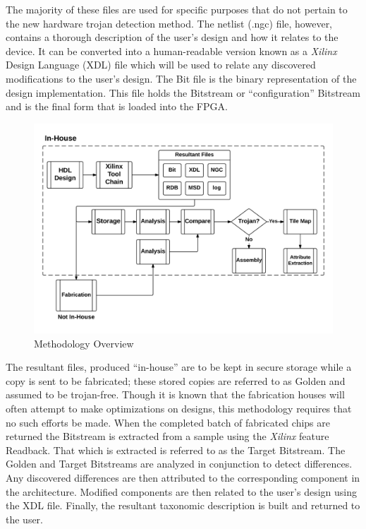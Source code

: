 \documentclass[journal, hidelinks]{IEEEtran}
\begin{document}
The majority of these files are used for specific purposes that do not pertain to the new hardware trojan detection method.
The netlist (.ngc) file, however, contains a thorough description of the user's design and how it relates to the device.
It can be converted into a human-readable version known as a \textit{Xilinx} Design Language (XDL) file which will be used to relate any discovered modifications to the user's design.
The Bit file is the binary representation of the design implementation.
This file holds the Bitstream or ``configuration'' Bitstream and is the final form that is loaded into the FPGA.
\begin{figure}
	\centering
	\includegraphics[width=1\linewidth]{Figures/methodologyOverview}
	\caption[Methodology Overview]{Methodology Overview}
	\label{fig:methodologyOverview}
\end{figure}
The resultant files, produced ``in-house'' are to be kept in secure storage while a copy is sent to be fabricated; these stored copies are referred to as Golden and assumed to be trojan-free.
Though it is known that the fabrication houses will often attempt to make optimizations on designs, this methodology requires that no such efforts be made.
When the completed batch of fabricated chips are returned the Bitstream is extracted from a sample using the \textit{Xilinx} feature Readback. 
That which is extracted is referred to as the Target Bitstream.
The Golden and Target Bitstreams are analyzed in conjunction to detect differences.
Any discovered differences are then attributed to the corresponding component in the architecture.
Modified components are then related to the user's design using the XDL file.
Finally, the resultant taxonomic description is built and returned to the user.
\end{document}
